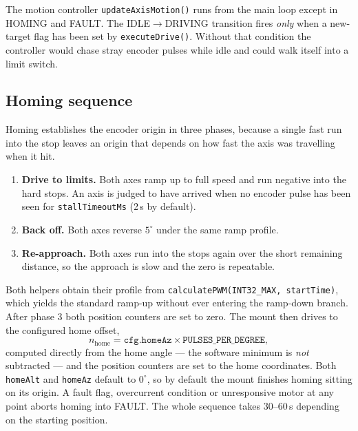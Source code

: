 \documentclass[11pt,a4paper]{article}
\begin{document}
The motion controller \texttt{updateAxisMotion()} runs from the main loop except in HOMING and FAULT. The IDLE$\rightarrow$DRIVING transition fires \emph{only} when a new-target flag has been set by \texttt{executeDrive()}. Without that condition the controller would chase stray encoder pulses while idle and could walk itself into a limit switch.

\subsection{Homing sequence}
\label{sec:homing}

Homing establishes the encoder origin in three phases, because a single fast run into the stop leaves an origin that depends on how fast the axis was travelling when it hit.

\begin{enumerate}
    \item \textbf{Drive to limits.} Both axes ramp up to full speed and run negative into the hard stops. An axis is judged to have arrived when no encoder pulse has been seen for \texttt{stallTimeoutMs} (2\,s by default).
    \item \textbf{Back off.} Both axes reverse $5^\circ$ under the same ramp profile.
    \item \textbf{Re-approach.} Both axes run into the stops again over the short remaining distance, so the approach is slow and the zero is repeatable.
\end{enumerate}

Both helpers obtain their profile from \texttt{calculatePWM(INT32\_MAX, startTime)}, which yields the standard ramp-up without ever entering the ramp-down branch. After phase 3 both position counters are set to zero. The mount then drives to the configured home offset,
\begin{equation}
n_\text{home} = \texttt{cfg.homeAz} \times \texttt{PULSES\_PER\_DEGREE},
\end{equation}
computed directly from the home angle --- the software minimum is \emph{not} subtracted --- and the position counters are set to the home coordinates. Both \texttt{homeAlt} and \texttt{homeAz} default to $0^\circ$, so by default the mount finishes homing sitting on its origin. A fault flag, overcurrent condition or unresponsive motor at any point aborts homing into FAULT. The whole sequence takes 30--60\,s depending on the starting position.
\end{document}
